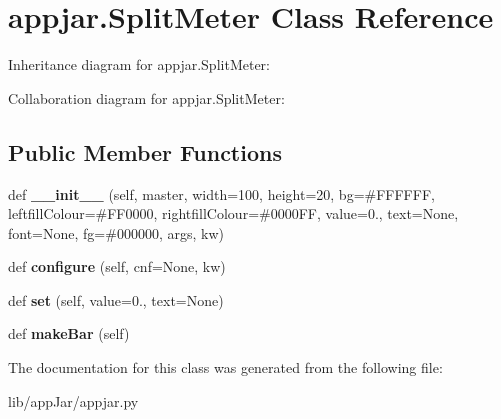\hypertarget{classappjar_1_1_split_meter}{}\section{appjar.\+Split\+Meter Class Reference}
\label{classappjar_1_1_split_meter}


Inheritance diagram for appjar.\+Split\+Meter\+:


Collaboration diagram for appjar.\+Split\+Meter\+:
\subsection*{Public Member Functions}
\begin{DoxyCompactItemize}
\item 
\mbox{\label{classappjar_1_1_split_meter_a282a8c9ef3b34efacf2c96fc31298c6c}} 
def {\bfseries \+\_\+\+\_\+init\+\_\+\+\_\+} (self, master, width=100, height=20, bg=\textquotesingle{}\#F\+F\+F\+F\+FF\textquotesingle{}, leftfill\+Colour=\textquotesingle{}\#F\+F0000\textquotesingle{}, rightfill\+Colour=\textquotesingle{}\#0000\+F\+F\textquotesingle{}, value=0., text=\+None, font=\+None, fg=\textquotesingle{}\#000000\textquotesingle{}, args, kw)
\item 
\mbox{\label{classappjar_1_1_split_meter_aaf9056b87ac3b8ca9702e81fe827cdd9}} 
def {\bfseries configure} (self, cnf=None, kw)
\item 
\mbox{\label{classappjar_1_1_split_meter_acb7c63657e43c6ca3cc9c06e98eb31d0}} 
def {\bfseries set} (self, value=0., text=None)
\item 
\mbox{\label{classappjar_1_1_split_meter_ab7a215aa053c02e59817623ef826fd56}} 
def {\bfseries make\+Bar} (self)
\end{DoxyCompactItemize}


The documentation for this class was generated from the following file\+:\begin{DoxyCompactItemize}
\item 
lib/app\+Jar/appjar.\+py\end{DoxyCompactItemize}
